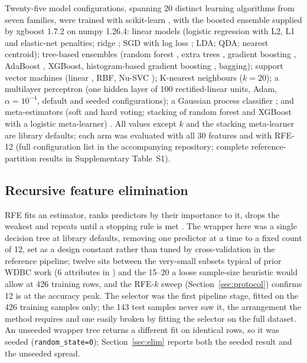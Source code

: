 \documentclass[review,12pt]{elsarticle}
\begin{document}
Twenty-five model configurations, spanning 20 distinct learning algorithms from seven families, were trained with scikit-learn \cite{pedregosa2011scikit}, with the boosted ensemble supplied by xgboost 1.7.2 \cite{chen2016xgboost} on numpy 1.26.4: linear models (logistic regression with L2, L1 and elastic-net penalties; ridge \cite{hoerl1970ridge}; SGD with log loss \cite{shalev2011pegasos}; LDA; QDA; nearest centroid); tree-based ensembles (random forest \cite{breiman2001random}, extra trees \cite{geurts2006extremely}, gradient boosting \cite{friedman2001greedy}, AdaBoost \cite{freund2012short}, XGBoost, histogram-based gradient boosting \cite{ke2017lightgbm}, bagging); support vector machines (linear \cite{cortes1995support}, RBF, Nu-SVC \cite{scholkopf2000new}); K-nearest neighbours ($k=20$); a multilayer perceptron (one hidden layer of 100 rectified-linear units, Adam, $\alpha=10^{-4}$, default and seeded configurations); a Gaussian process classifier \cite{rasmussen2006gaussian}; and meta-estimators (soft and hard voting; stacking of random forest and XGBoost with a logistic meta-learner) \cite{wolpert1992stacked}. All values except $k$ and the stacking meta-learner are library defaults; each arm was evaluated with all 30 features and with RFE-12 (full configuration list in the accompanying repository; complete reference-partition results in Supplementary Table~S1).

\subsection{Recursive feature elimination}

RFE fits an estimator, ranks predictors by their importance to it, drops the weakest and repeats until a stopping rule is met \cite{guyon2002rfe}. The wrapper here was a single decision tree at library defaults, removing one predictor at a time to a fixed count of 12, set as a design constant rather than tuned by cross-validation in the reference pipeline; twelve sits between the very-small subsets typical of prior WDBC work (6 attributes in \cite{lavanya2011analysis}) and the 15--20 a loose sample-size heuristic would allow at 426 training rows, and the RFE-$k$ sweep (Section~\ref{sec:protocol}) confirms 12 is at the accuracy peak. The selector was the first pipeline stage, fitted on the 426 training samples only; the 143 test samples never saw it, the arrangement the method requires and one easily broken by fitting the selector on the full dataset. An unseeded wrapper tree returns a different fit on identical rows, so it was seeded (\texttt{random\_state=0}); Section~\ref{sec:elim} reports both the seeded result and the unseeded spread.
\end{document}
